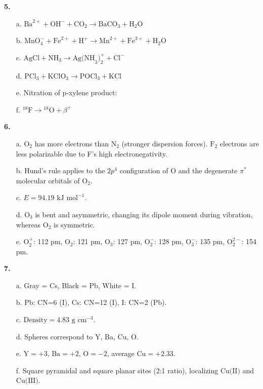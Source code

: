 \documentclass[10pt,a4paper]{article}
\begin{document}
\textbf{5.}
\begin{itemize}
     \item[a.] $\text{Ba}^{2+} + \text{OH}^- + \text{CO}_2 \rightarrow \text{BaCO}_3 + \text{H}_2\text{O}$
     \item[b.] $\text{MnO}_4^- + \text{Fe}^{2+} + \text{H}^+ \rightarrow \text{Mn}^{2+} + \text{Fe}^{3+} + \text{H}_2\text{O}$
     \item[c.] $\text{AgCl} + \text{NH}_3 \rightarrow \text{Ag(NH}_3)_2^+ + \text{Cl}^-$
     \item[d.] $\text{PCl}_3 + \text{KClO}_3 \rightarrow \text{POCl}_3 + \text{KCl}$
     \item[e.] Nitration of p-xylene product: 
     \item[f.] $^{18}\text{F} \rightarrow {}^{18}\text{O} + \beta^+$
\end{itemize}

\textbf{6.}
\begin{itemize}
     \item[a.] $\text{O}_2$ has more electrons than $\text{N}_2$ (stronger dispersion forces). $\text{F}_2$ electrons are less polarizable due to F's high electronegativity.
     \item[b.] Hund's rule applies to the $2p^4$ configuration of O and the degenerate $\pi^*$ molecular orbitals of $\text{O}_2$.
     \item[c.] $E = 94.19\text{ kJ mol}^{-1}$.
     \item[d.] $\text{O}_3$ is bent and asymmetric, changing its dipole moment during vibration, whereas $\text{O}_2$ is symmetric.
     \item[e.] $\text{O}_2^+$: 112 pm, $\text{O}_2$: 121 pm, $\text{O}_3$: 127 pm, $\text{O}_2^-$: 128 pm, $\text{O}_3^-$: 135 pm, $\text{O}_2^{2-}$: 154 pm.
\end{itemize}

\textbf{7.}
\begin{itemize}
     \item[a.] Gray = Cs, Black = Pb, White = I.
     \item[b.] Pb: CN=6 (I), Cs: CN=12 (I), I: CN=2 (Pb).
     \item[c.] $\text{Density} = 4.83\text{ g cm}^{-3}$.
     \item[d.] Spheres correspond to Y, Ba, Cu, O.
     \item[e.] $\text{Y}=+3$, $\text{Ba}=+2$, $\text{O}=-2$, average $\text{Cu}=+2.33$.
     \item[f.] Square pyramidal and square planar sites (2:1 ratio), localizing $\text{Cu(II)}$ and $\text{Cu(III)}$.
\end{itemize}
\end{document}
